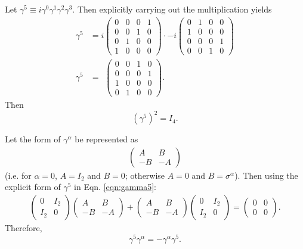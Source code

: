  \label{ssc:gamma52}

Let $\gamma^5\equiv i\gamma^0 \gamma^1 \gamma^2 \gamma^3$. Then explicitly
carrying out the
multiplication yields
\begin{align} \nonumber
\gamma^5&=i
\begin{pmatrix}
0 & 0 & 0 & 1\\
0 & 0 & 1 & 0\\
0 & 1 & 0 & 0\\
1 & 0 & 0 & 0
\end{pmatrix}
\cdot -i
\begin{pmatrix}
0 & 1 & 0 & 0\\
1 & 0 & 0 & 0\\
0 & 0 & 0 & 1\\
0 & 0 & 1 & 0
\end{pmatrix}
\\ \label{eqn:gamma5}
\gamma^5 &= \ \,
\begin{pmatrix}
0 & 0 & 1 & 0\\
0 & 0 & 0 & 1\\
1 & 0 & 0 & 0 \\
0 & 1 & 0 & 0
\end{pmatrix}.
\end{align}
Then
\begin{equation}\label{eqn:gamma52}
(\gamma^5)^2=I_4.
\end{equation}

\label{ssc:gamma5Anticommutator}

Let the form of $\gamma^\alpha$ be represented as
\begin{align*}
\begin{pmatrix}
A & B\\
-B & -A
\end{pmatrix}
\end{align*}
(i.e. for $\alpha=0$, $A=I_2$ and $B=0$; otherwise $A=0$ and $B=\sigma^\alpha$).
Then using the
explicit form of $\gamma^5$ in Eqn. \ref{eqn:gamma5}:
\begin{align*}
\begin{pmatrix}
0 & I_2\\
I_2 & 0
\end{pmatrix}
\begin{pmatrix}
A & B\\
-B & -A
\end{pmatrix}
+
\begin{pmatrix}
A & B\\
-B & -A
\end{pmatrix}
\begin{pmatrix}
0 & I_2\\
I_2 & 0
\end{pmatrix}
=
\begin{pmatrix}
0 & 0\\
0 & 0
\end{pmatrix}
.
\end{align*}
Therefore, 
\begin{equation}\label{eqn:gamma5Anticommutator}
\gamma^5 \gamma^\alpha=-\gamma^\alpha \gamma^5.
\end{equation}

